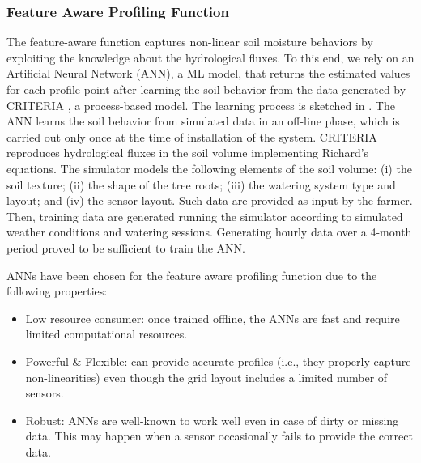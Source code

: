 \subsubsection{Feature Aware Profiling Function}
The feature-aware function captures non-linear soil moisture behaviors by exploiting the knowledge about the hydrological fluxes. To this end, we rely on an Artificial Neural Network (ANN), a ML model, that returns the estimated values for each profile point after learning the soil behavior from the data generated by CRITERIA \cite{Bittelli2011253}, a process-based model.
The learning process is sketched in .
The ANN learns the soil behavior from simulated data in an off-line phase, which is carried out only once at the time of installation of the system.
CRITERIA reproduces hydrological fluxes in the soil volume implementing Richard's equations.
The simulator models the following elements of the soil volume: (i) the soil texture; (ii) the shape of the tree roots; (iii) the watering system type and layout; and (iv) the sensor layout.
Such data are provided as input by the farmer.
Then, training data are generated running the simulator according to simulated weather conditions and watering sessions.
Generating hourly data over a 4-month period proved to be sufficient to train the ANN.

ANNs have been chosen for the feature aware profiling function due to the following properties:
\begin{itemize}
    \item Low resource consumer: once trained offline, the ANNs are fast and require limited computational resources. 
    \item Powerful \& Flexible: can provide accurate profiles (i.e., they properly capture non-linearities) even though the grid layout includes a limited number of sensors. 
    \item Robust: ANNs are well-known to work well even in case of dirty or missing data. This may happen when a sensor occasionally fails to provide the correct data. 
\end{itemize}

